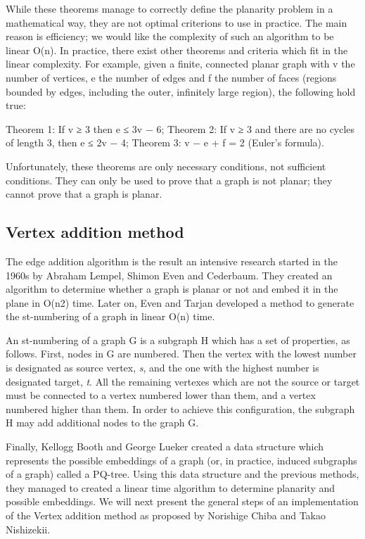 While these theorems manage to correctly define the planarity problem in a mathematical way, they are not optimal 
criterions to use in practice. The main reason is efficiency; we would like the complexity of such an algorithm 
to be linear O(n). In practice, there exist other theorems and criteria which fit in the linear complexity. For 
example, given a finite, connected planar graph with v the number of vertices, e the number of edges and 
f the number of faces (regions bounded by edges, including the outer, infinitely large region), the following 
hold true:

Theorem 1: If v ≥ 3 then e ≤ 3v − 6;
Theorem 2: If v ≥ 3 and there are no cycles of length 3, then e ≤ 2v − 4;
Theorem 3: v − e + f = 2 (Euler's formula).

Unfortunately, these theorems are only necessary conditions, not sufficient conditions. They can only be used to 
prove that a graph is not planar; they cannot prove that a graph is planar.

\subsection{Vertex addition method}

The edge addition algorithm is the result an intensive research started in the 1960s by Abraham Lempel, Shimon Even
and Cederbaum. They created an algorithm to determine whether a graph is planar or not and embed it in the plane in 
O(n2) time. Later on, Even and Tarjan developed a method to generate the st-numbering of a graph in linear O(n) time.

An st-numbering of a graph G is a subgraph H which has a set of properties, as follows. First, nodes in G are numbered. 
Then the vertex with the lowest number is designated as source vertex, \emph{s}, and the one with the highest number 
is designated target, \emph{t}. All the remaining vertexes which are not the source or target must be connected to a 
vertex numbered lower than them, and a vertex numbered higher than them. In order to achieve this configuration, the 
subgraph H may add additional nodes to the graph G. 

Finally, Kellogg Booth and George Lueker created a data structure which represents the possible embeddings of a graph 
(or, in practice, induced subgraphs of a graph) called a PQ-tree. Using this data structure and the previous methods, 
they managed to created a linear time algorithm to determine planarity and possible embeddings. We will next present 
the general steps of an implementation of the Vertex addition method as proposed by Norishige Chiba and Takao Nishizekii.

